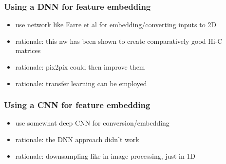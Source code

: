 


\subsubsection{Using a DNN for feature embedding} \label{sec:improve:DNN_embedding}
\begin{itemize}
\item use network like Farre et al for embedding/converting inputs to 2D
\item rationale: this nw has been shown to create comparatively good Hi-C matrices 
\item rationale: pix2pix could then improve them
\item rationale: transfer learning can be employed
\end{itemize}

\subsubsection{Using a CNN for feature embedding} \label{sec:improve:CNN_embedding}
\begin{itemize}
 \item use somewhat deep CNN for conversion/embedding
 \item rationale: the DNN approach didn't work
 \item rationale: downsampling like in image processing, just in 1D
\end{itemize}















